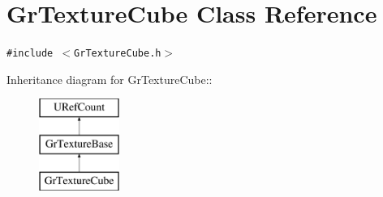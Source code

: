\hypertarget{class_gr_texture_cube}{
\section{GrTextureCube Class Reference}
\label{class_gr_texture_cube}
}
{\tt \#include $<$GrTextureCube.h$>$}

Inheritance diagram for GrTextureCube::\begin{figure}[H]
\begin{center}
\leavevmode
\includegraphics[height=3cm]{class_gr_texture_cube}
\end{center}
\end{figure}
